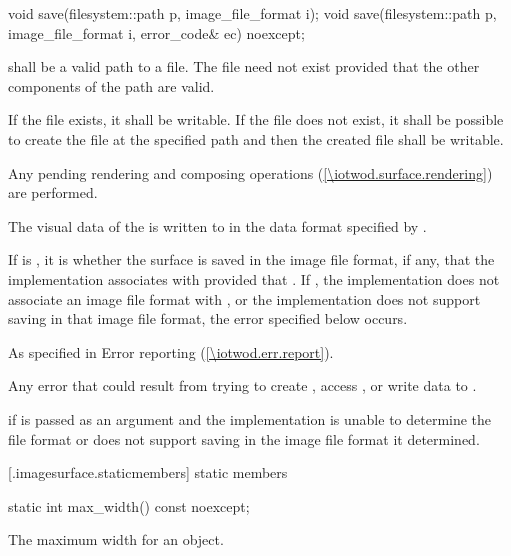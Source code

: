 %
\begin{itemdecl}
void save(filesystem::path p, image_file_format i);
void save(filesystem::path p, image_file_format i, error_code& ec) noexcept;
\end{itemdecl}
\begin{itemdescr}
\pnum
\requires
{} shall be a valid path to a file. The file need not exist provided that the other components of the path are valid.

\pnum
If the file exists, it shall be writable. If the file does not exist, it shall be possible to create the file at the specified path and then the created file shall be writable.

\pnum
\effects
Any pending rendering and composing operations (\ref{\iotwod.surface.rendering}) are performed.

\pnum
The visual data of the \underlyingimagesurface is written to  in the data format specified by .

\pnum
If  is , it is  whether the surface is saved in the image file format, if any, that the implementation associates with  provided that . If , the implementation does not associate an image file format with , or the implementation does not support saving in that image file format, the error specified below occurs.

\pnum
\throws
As specified in Error reporting (\ref{\iotwod.err.report}).

\pnum
\errors
Any error that could result from trying to create , access , or write data to .

\pnum
{} if  is passed as an argument and the implementation is unable to determine the file format or does not support saving in the image file format it determined.
\end{itemdescr}

 [\iotwod.imagesurface.staticmembers] { static members}

%
\begin{itemdecl}
static int max_width() const noexcept;
\end{itemdecl}
\begin{itemdescr}
\pnum
\returns
The maximum width for an  object.
\end{itemdescr}

